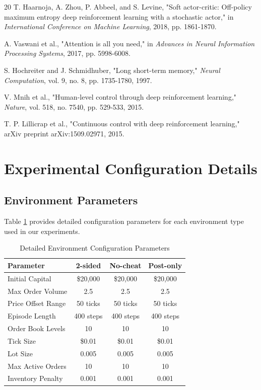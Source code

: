 \documentclass[conference]{IEEEtran}
\begin{document}
\begin{thebibliography}{20}
T. Haarnoja, A. Zhou, P. Abbeel, and S. Levine, "Soft actor-critic: Off-policy maximum entropy deep reinforcement learning with a stochastic actor," in \textit{International Conference on Machine Learning}, 2018, pp. 1861-1870.

A. Vaswani et al., "Attention is all you need," in \textit{Advances in Neural Information Processing Systems}, 2017, pp. 5998-6008.

S. Hochreiter and J. Schmidhuber, "Long short-term memory," \textit{Neural Computation}, vol. 9, no. 8, pp. 1735-1780, 1997.

V. Mnih et al., "Human-level control through deep reinforcement learning," \textit{Nature}, vol. 518, no. 7540, pp. 529-533, 2015.

T. P. Lillicrap et al., "Continuous control with deep reinforcement learning," arXiv preprint arXiv:1509.02971, 2015.

\end{thebibliography}



\appendix

\section{Experimental Configuration Details}

\subsection{Environment Parameters}

Table \ref{tab:env_params} provides detailed configuration parameters for each environment type used in our experiments.

\begin{table}[!t]
\renewcommand{\arraystretch}{1.3}
\caption{Detailed Environment Configuration Parameters}
\label{tab:env_params}
\centering
\begin{tabular}{|l|c|c|c|}
\hline
\textbf{Parameter} & \textbf{2-sided} & \textbf{No-cheat} & \textbf{Post-only} \\
\hline
Initial Capital & \$20,000 & \$20,000 & \$20,000 \\
Max Order Volume & 2.5 & 2.5 & 2.5 \\
Price Offset Range & 50 ticks & 50 ticks & 50 ticks \\
Episode Length & 400 steps & 400 steps & 400 steps \\
Order Book Levels & 10 & 10 & 10 \\
Tick Size & \$0.01 & \$0.01 & \$0.01 \\
Lot Size & 0.005 & 0.005 & 0.005 \\
Max Active Orders & 10 & 10 & 10 \\
Inventory Penalty & 0.001 & 0.001 & 0.001 \\
\hline
\end{tabular}
\end{table}
\end{document}
